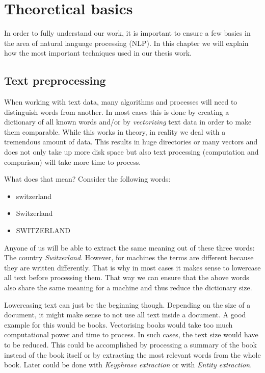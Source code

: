 \section{Theoretical basics}
In order to fully understand our work,
it is important to ensure a few basics in the area of natural language processing (NLP).
In this chapter we will explain how the most important techniques used in our thesis work.

\subsection{Text preprocessing}
\label{sec:text_preprocessing}

When working with text data, many algorithms and processes will need to distinguish words from another.
In most cases this is done by creating a dictionary of all known words and/or by \textit{vectorizing} text data
in order to make them comparable.
While this works in theory, in reality we deal with a tremendous amount of data.
This results in huge directories or many vectors and does not only take up more disk space
but also text processing (computation and comparison) will take more time to process.

What does that mean?
Consider the following words:

\begin{itemize}
    \item switzerland
    \item Switzerland
    \item SWITZERLAND
\end{itemize}

Anyone of us will be able to extract the same meaning out of these three words: The country \textit{Switzerland}.
However, for machines the terms are different because they are written differently.
That is why in most cases it makes sense to lowercase all text before processing them.
That way we can ensure that the above words also share the same meaning for a machine and thus reduce the dictionary size.


Lowercasing text can just be the beginning though.
Depending on the size of a document, it might make sense to not use all text inside a document.
A good example for this would be books.
Vectorising books would take too much computational power and time to process.
In such cases, the text size would have to be reduced.
This could be accomplished by processing a summary of the book instead of the book itself
or by extracting the most relevant words from the whole book.
Later could be done with \textit{Keyphrase extraction} or with \textit{Entity extraction}.

